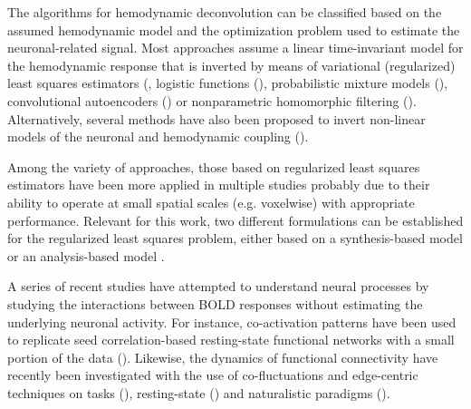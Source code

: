The algorithms for hemodynamic deconvolution can be classified based on the assumed hemodynamic model and the optimization problem used to estimate the neuronal-related signal. Most approaches assume a linear time-invariant model for the hemodynamic response that is inverted by means of variational (regularized) least squares estimators (\citealt{glover1999deconvolution,gitelman2003ModelingRegionalPsychophysiologic,karahanoglu2013TotalActivationfMRI,gaudes2011DetectionCharacterizationSingletrial,caballero-gaudes2019DeconvolutionAlgorithmMultiecho,caballerogaudes2013ParadigmFreeMapping,gaudes2012StructuredSparseDeconvolution,cherkaoui2019SparsitybasedBlindDeconvolution,hernandez2011neuronal,costantini2021,Huetel2021}, logistic functions (\citealt{Bush2013,Bush2015a,Loula2018}), probabilistic mixture models (\cite{pidnebesna2019}), convolutional autoencoders (\citealt{hutel2018neural}) or nonparametric homomorphic filtering (\citealt{Sreenivasan2015}). Alternatively, several methods have also been proposed to invert non-linear models of the neuronal and hemodynamic coupling (\citealt{Riera2004,Friston2008,Havlicek2011,Aslan2016,Madi2017,RuizEuler2018}). 

Among the variety of approaches, those based on regularized least squares estimators have been more applied in multiple studies probably due to their ability to operate at small spatial scales (e.g. voxelwise) with appropriate performance. Relevant for this work, two different formulations can be established for the regularized least squares problem, either based on a synthesis-based model \citealt{} or an analysis-based model \citealt{}.

A series of recent studies have attempted to understand neural processes by studying the interactions between BOLD responses without estimating the underlying neuronal activity. For instance, co-activation patterns have been used to replicate seed correlation-based resting-state functional networks with a small portion of the data (\citealt{liu2013time,liu2013decomposition,liu2018co,majeed2009spatiotemporal,majeed2011spatiotemporal,cifre2020revisiting,cifre2020further,zhang2020relationship}). Likewise, the dynamics of functional connectivity have recently been investigated with the use of co-fluctuations and edge-centric techniques on tasks (\citealt{faskowitz2021EdgecentricModelHarmonizing}), resting-state (\citealt{zamaniesfahlani2020HighamplitudeCofluctuationsCortical}) and naturalistic paradigms (\citealt{faskowitz2020EdgecentricFunctionalNetwork,betzel2020TemporalFluctuationsBrain}). %

